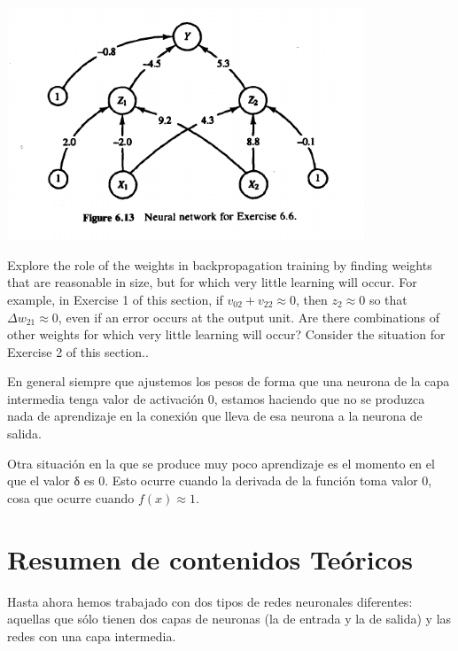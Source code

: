 \begin{problem}[6]
\spart

\end{problem}

\begin{center}
\includegraphics[width=0.8\textwidth]{img/figure6-13.png}
\end{center}

\begin{problem}[7]
Explore the role of the weights in backpropagation training by finding weights that are reasonable in size, but for which very little learning will occur. For example, in Exercise 1 of this section, if $v_{02}+v_{22}\approx 0$, then $z_2 \approx 0$ so that $Δw_{21}\approx 0$, even if an error occurs at the output unit. Are there combinations of other weights for which very little
learning will occur? Consider the situation for Exercise 2 of this section..

\solution

En general siempre que ajustemos los pesos de forma que una neurona de la capa intermedia tenga valor de activación 0, estamos haciendo que no se produzca nada de aprendizaje en la conexión que lleva de esa neurona a la neurona de salida.

Otra situación en la que se produce muy poco aprendizaje es el momento en el que el valor δ es 0. Esto ocurre cuando la derivada de la función toma valor 0, cosa que ocurre cuando $f(x)\approx 1$.
\end{problem}

\section{Resumen de contenidos Teóricos}
Hasta ahora hemos trabajado con dos tipos de redes neuronales diferentes: aquellas que sólo tienen dos capas de neuronas (la de entrada y la de salida) y las redes con una capa intermedia.

